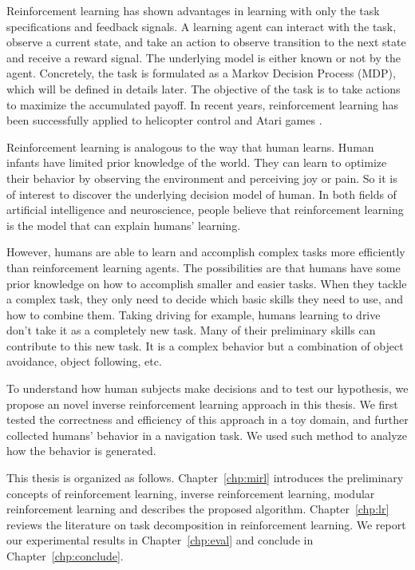 Reinforcement learning has shown advantages in learning with only the task
specifications and feedback signals. A learning agent can interact with the
task, observe a current state, and take an action to observe
transition to the next state and receive a reward signal. The underlying model is either
known or not by the agent. Concretely, the task is formulated as a
Markov Decision Process (MDP), which will be defined in details later.
The objective of the task is to take actions to maximize the accumulated payoff.
In recent years, reinforcement learning has been successfully applied to
helicopter control \cite{ng2006autonomous} and Atari games \cite{mnih2013playing}.

Reinforcement learning is analogous to the way that human learns. Human infants
have limited prior knowledge of the world. They can learn to optimize
their behavior by observing the environment and perceiving joy or pain. So it is
of interest to discover the underlying decision model of human. In both fields
of artificial intelligence and neuroscience, people believe that reinforcement
learning is the model that can explain humans' learning.

However, humans are able to learn and accomplish complex tasks more efficiently than
reinforcement learning agents. The possibilities are that humans have some prior
knowledge on how to accomplish smaller and easier tasks. When they tackle a
complex task, they only need to decide which basic skills they need to use, and
how to combine them. Taking driving for example, humans learning to drive don't
take it as a completely new task. Many of their preliminary skills can
contribute to this new task. It is a complex behavior but a combination of
object avoidance, object following, etc.

To understand how human subjects make decisions and to test our hypothesis, we
propose an novel inverse reinforcement learning approach in this thesis.
We first tested the correctness and efficiency of this approach in a toy domain,
and further collected humans' behavior in a navigation task. We used such method
to analyze how the behavior is generated.

This thesis is organized as follows. Chapter~\ref{chp:mirl} introduces the
preliminary concepts of reinforcement learning, inverse reinforcement learning,
modular reinforcement learning and describes the proposed algorithm.
Chapter~\ref{chp:lr} reviews the literature on task decomposition in
reinforcement learning. We report our experimental results in
Chapter~\ref{chp:eval} and conclude in Chapter~\ref{chp:conclude}.
